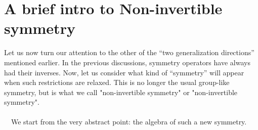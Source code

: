 \documentclass{ltjsarticle}
\theoremstyle{mystyle} %
\numberwithin{equation}{section}
\begin{document}
\section{A brief intro to Non-invertible symmetry}
Let us now turn our attention to the other of the “two generalization directions” mentioned earlier. 
In the previous discussions, symmetry operators have always had their inverses. 
Now, let us consider what kind of “symmetry” will appear when such restrictions are relaxed. 
This is no longer the usual group-like symmetry, but is what we call "non-invertible symmetry" or "non-invertible symmetry". \\
\\
　We start from the very abstract point: the algebra of such a new symmetry. 
\end{document}

